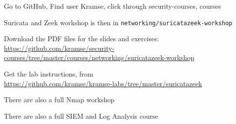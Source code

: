 \documentclass[Screen16to9,17pt]{foils}
\begin{document}
\begin{list2}
\item Go to GitHub, Find user Kramse, click through security-courses, courses\\
\item Suricata and Zeek workshop is then in \verb+networking/suricatazeek-workshop+
\item Download the PDF files for the slides and exercises:\\  {\footnotesize \url{https://github.com/kramse/security-courses/tree/master/courses/networking/suricatazeek-workshop}}

\item Get the lab instructions, from\\ {\footnotesize\url{https://github.com/kramse/kramse-labs/tree/master/suricatazeek}}

\item There are also a full Nmap workshop\\
{\footnotesize{}}

\item There are also a full SIEM and Log Analysis course\\
{\footnotesize{}}
\end{list2}


\myquestionspage
\end{document}
